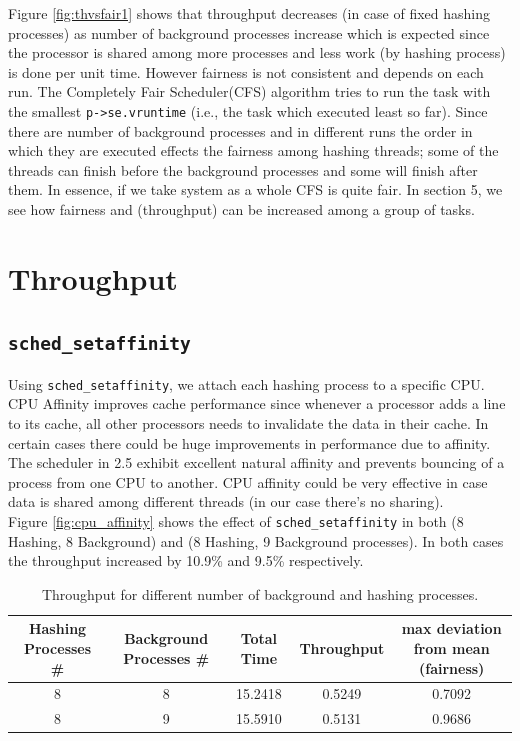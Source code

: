 \documentclass[10pt] {article}
\begin{document}
Figure \ref{fig:thvsfair1} shows that throughput decreases (in case of fixed hashing processes) as number of background processes increase which is expected since the processor is shared among more processes and less work (by hashing process) is done per unit time. However fairness is not consistent and depends on each run. The Completely Fair Scheduler(CFS) algorithm tries to run the task with the smallest \texttt{p->se.vruntime} (i.e., the task which executed least so far). Since there are number of background processes and in different runs the order in which they are executed effects the fairness among hashing threads; some of the threads can finish before the background processes and some will finish after them. In essence, if we take system as a whole CFS is quite fair. In section 5, we see how fairness and (throughput) can be increased among a group of tasks.

\section{Throughput}

\subsection{\texttt{sched\_setaffinity} }

Using \texttt{sched\_setaffinity}, we attach each hashing process to a specific CPU. CPU Affinity improves cache performance since whenever a processor adds a line to its cache, all other processors needs to invalidate the data in their cache. In certain cases there could be huge improvements in performance due to affinity. The scheduler in 2.5 exhibit excellent natural affinity and prevents bouncing of a process from one CPU to another. CPU affinity could be very effective in case data is shared among different threads (in our case there's no sharing).\\

\noindent Figure \ref{fig:cpu_affinity} shows the effect of \texttt{sched\_setaffinity} in both (8 Hashing, 8 Background) and (8 Hashing, 9 Background processes). In both cases the throughput increased by 10.9\% and 9.5\% respectively.

\begin{table}
\centering
\begin{tabular}{ |c|c|c|c|c| } 
 \hline
\textbf{Hashing Processes \#} & \textbf{Background Processes \#} & \textbf{Total Time} & \textbf{Throughput} & \textbf{max deviation from mean (fairness)}\\
\hline
8 & 8 & 15.2418 & 0.5249 & 0.7092\\ 
\hline
8 & 9 & 15.5910 & 0.5131 & 0.9686\\
\hline
\end{tabular}
\caption{Throughput for different number of background and hashing processes.}
\label{table:nvsnplusone}
\end{table}
\end{document}
